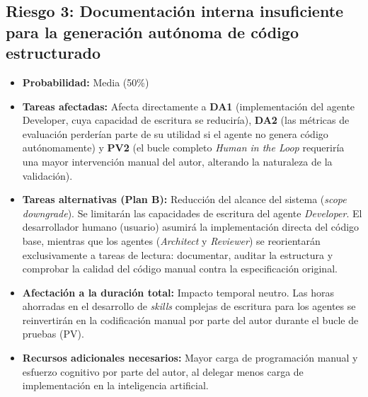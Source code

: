 \documentclass[11pt, letterpaper]{article}
\begin{document}
\subsection{Riesgo 3: Documentación interna insuficiente para la generación autónoma de código estructurado}
\begin{itemize}
    \item \textbf{Probabilidad:} Media (50\%)
    \item \textbf{Tareas afectadas:} Afecta directamente a \textbf{DA1} (implementación del agente Developer, cuya capacidad de escritura se reduciría), \textbf{DA2} (las métricas de evaluación perderían parte de su utilidad si el agente no genera código autónomamente) y \textbf{PV2} (el bucle completo \textit{Human in the Loop} requeriría una mayor intervención manual del autor, alterando la naturaleza de la validación).
    \item \textbf{Tareas alternativas (Plan B):} Reducción del alcance del sistema (\textit{scope downgrade}). Se limitarán las capacidades de escritura del agente \textit{Developer}. El desarrollador humano (usuario) asumirá la implementación directa del código base, mientras que los agentes (\textit{Architect} y \textit{Reviewer}) se reorientarán exclusivamente a tareas de lectura: documentar, auditar la estructura y comprobar la calidad del código manual contra la especificación original.
    \item \textbf{Afectación a la duración total:} Impacto temporal neutro. Las horas ahorradas en el desarrollo de \textit{skills} complejas de escritura para los agentes se reinvertirán en la codificación manual por parte del autor durante el bucle de pruebas (PV).
    \item \textbf{Recursos adicionales necesarios:} Mayor carga de programación manual y esfuerzo cognitivo por parte del autor, al delegar menos carga de implementación en la inteligencia artificial.
\end{itemize}
\end{document}
